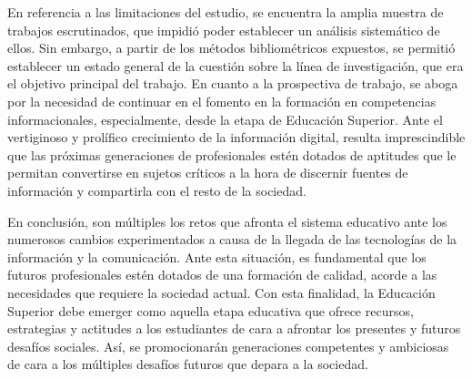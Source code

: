 \documentclass[spanish]{textolivre}
\begin{document}
En referencia a las limitaciones del estudio, se encuentra la amplia muestra de trabajos escrutinados, que impidió poder establecer un análisis sistemático de ellos. Sin embargo, a partir de los métodos bibliométricos expuestos, se permitió establecer un estado general de la cuestión sobre la línea de investigación, que era el objetivo principal del trabajo. En cuanto a la prospectiva de trabajo, se aboga por la necesidad de continuar en el fomento en la formación en competencias informacionales, especialmente, desde la etapa de Educación Superior. Ante el vertiginoso y prolífico crecimiento de la información digital, resulta imprescindible que las próximas generaciones de profesionales estén dotados de aptitudes que le permitan convertirse en sujetos críticos a la hora de discernir fuentes de información y compartirla con el resto de la sociedad.

En conclusión, son múltiples los retos que afronta el sistema educativo ante los numerosos cambios experimentados a causa de la llegada de las tecnologías de la información y la comunicación. Ante esta situación, es fundamental que los futuros profesionales estén dotados de una formación de calidad, acorde a las necesidades que requiere la sociedad actual. Con esta finalidad, la Educación Superior debe emerger como aquella etapa educativa que ofrece recursos, estrategias y actitudes a los estudiantes de cara a afrontar los presentes y futuros desafíos sociales. Así, se promocionarán generaciones competentes y ambiciosas de cara a los múltiples desafíos futuros que depara a la sociedad.






\printbibliography\label{sec-bib}
\end{document}
